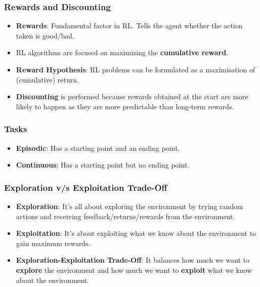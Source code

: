 \documentclass[11pt,a4paper]{article}
\begin{document}
\subsubsection{Rewards and Discounting}\label{rewards-and-discounting}

\begin{itemize}
\tightlist
\item
  \textbf{Rewards}: Fundamental factor in RL. Tells the agent whether the action taken is good/bad.
\item
  RL algorithms are focused on maximizing the \textbf{cumulative reward}.
\item
  \textbf{Reward Hypothesis}: RL problems can be formulated as a maximisation of (cumulative) return.
\item
  \textbf{Discounting} is performed because rewards obtained at the start are more likely to happen as they are more predictable than long-term rewards.
\end{itemize}

\subsubsection{Tasks}\label{tasks}

\begin{itemize}
\tightlist
\item
  \textbf{Episodic}: Has a starting point and an ending point.
\item
  \textbf{Continuous}: Has a starting point but no ending point.
\end{itemize}

\subsubsection{Exploration v/s Exploitation Trade-Off}\label{exploration-vs-exploitation-trade-off}

\begin{itemize}
\tightlist
\item
  \textbf{Exploration}: It's all about exploring the environment by trying random actions and receiving feedback/returns/rewards from the environment.
\item
  \textbf{Exploitation}: It's about exploiting what we know about the environment to gain maximum rewards.
\item
  \textbf{Exploration-Exploitation Trade-Off}: It balances how much we want to \textbf{explore} the environment and how much we want to \textbf{exploit} what we know about the environment.
\end{itemize}
\end{document}
